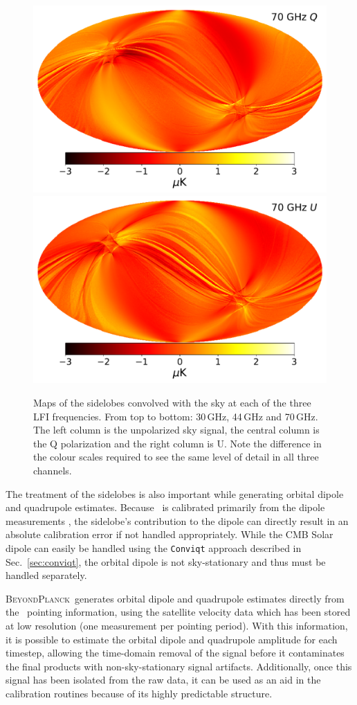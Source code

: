 \documentclass[twocolumn]{aa}
\newcommand{\BP}{\textsc{BeyondPlanck}}
\begin{document}
\begin{figure}[t]
  \includegraphics[width=0.33\linewidth]{scripts/070_Q_sl_mean.pdf}
  \includegraphics[width=0.33\linewidth]{scripts/070_U_sl_mean.pdf}\\
  \caption{Maps of the sidelobes convolved with the sky at each of the three LFI frequencies. From top to bottom: 30\,GHz, 44\,GHz and 70\,GHz. The left column is the unpolarized sky signal, the central column is the Q polarization and the right column is U. Note the difference in the colour scales required to see the same level of detail in all three channels. 
  }\label{fig:slmean}
\end{figure}

The treatment of the sidelobes is also important while generating orbital dipole and quadrupole estimates. Because \Planck\ is calibrated primarily from the dipole measurements \citep{planck2016-l01,npipe,BP07}, the sidelobe's contribution to the dipole can directly result in an absolute calibration error if not handled appropriately. While the CMB Solar dipole can easily be handled using the \texttt{Conviqt} approach described in Sec.~\ref{sec:conviqt}, the orbital dipole is not sky-stationary and thus must be handled separately. 

\BP\ generates orbital dipole and quadrupole estimates directly from the \Planck\ pointing information, using the satellite velocity data which has been stored at low resolution (one measurement per pointing period). With this information, it is possible to estimate the orbital dipole and quadrupole amplitude for each timestep, allowing the time-domain removal of the signal before it contaminates the final products with non-sky-stationary signal artifacts. Additionally, once this signal has been isolated from the raw data, it can be used as an aid in the calibration routines because of its highly predictable structure.
\end{document}
